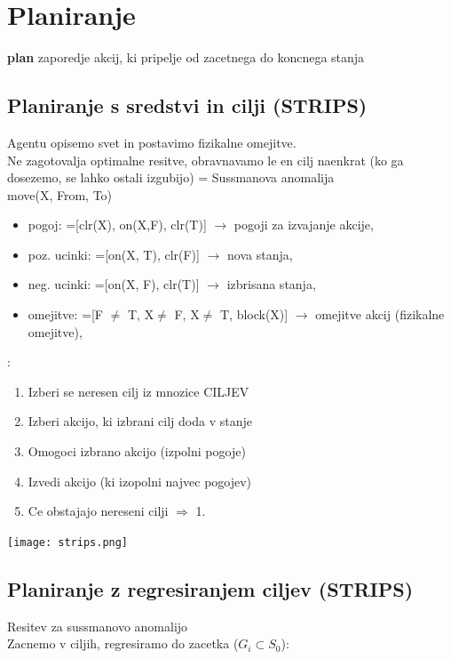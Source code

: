 \section{Planiranje}

\textbf{plan} zaporedje akcij, ki pripelje od zacetnega do koncnega stanja

\subsection{Planiranje s sredstvi in cilji (STRIPS)}
Agentu opisemo svet in postavimo fizikalne omejitve.\\
Ne zagotovalja optimalne resitve, obravnavamo le en cilj naenkrat (ko ga dosezemo, se lahko ostali izgubijo) = Sussmanova anomalija\\
 move(X, From, To)
\begin{itemize}[noitemsep,topsep=0pt,leftmargin=*]
    \item pogoj: =[clr(X), on(X,F), clr(T)] $\rightarrow$ pogoji za izvajanje akcije,
    \item poz. ucinki: =[on(X, T), clr(F)] $\rightarrow$ nova stanja,
    \item neg. ucinki: =[on(X, F), clr(T)] $\rightarrow$ izbrisana stanja,
    \item omejitve: =[F $\neq$ T, X$\neq$ F, X$\neq$ T, block(X)] $\rightarrow$ omejitve akcij (fizikalne omejitve),
\end{itemize}
:
\begin{enumerate}[noitemsep,topsep=0pt,leftmargin=*]
    \item Izberi se neresen cilj iz mnozice CILJEV
    \item Izberi akcijo, ki izbrani cilj doda v stanje
    \item Omogoci izbrano akcijo (izpolni pogoje)
    \item Izvedi akcijo (ki izopolni najvec pogojev)
    \item Ce obstajajo nereseni cilji $\Rightarrow$ 1.
\end{enumerate}

\texttt{[image: strips.png]}



\subsection{Planiranje z regresiranjem ciljev (STRIPS)}
Resitev za sussmanovo anomalijo\\
Zacnemo v ciljih, regresiramo do zacetka ($G_i \subset S_0$):

